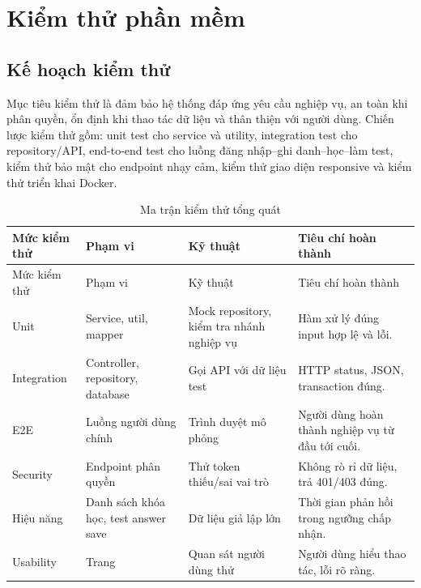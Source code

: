 \documentclass[12pt,a4paper]{report}
\begin{document}
\chapter{Kiểm thử phần mềm}

\section{Kế hoạch kiểm thử}
Mục tiêu kiểm thử là đảm bảo hệ thống đáp ứng yêu cầu nghiệp vụ, an toàn khi phân quyền, ổn định khi thao tác dữ liệu và thân thiện với người dùng. Chiến lược kiểm thử gồm: unit test cho service và utility, integration test cho repository/API, end-to-end test cho luồng đăng nhập--ghi danh--học--làm test, kiểm thử bảo mật cho endpoint nhạy cảm, kiểm thử giao diện responsive và kiểm thử triển khai Docker.

\begin{longtable}{L{2.2cm} L{3.2cm} L{4.2cm} L{4.8cm}}
\caption{Ma trận kiểm thử tổng quát}\label{tab:test-plan}\\
\toprule
Mức kiểm thử & Phạm vi & Kỹ thuật & Tiêu chí hoàn thành \\
\midrule
\endfirsthead\toprule Mức kiểm thử & Phạm vi & Kỹ thuật & Tiêu chí hoàn thành \\\midrule\endhead
Unit & Service, util, mapper & Mock repository, kiểm tra nhánh nghiệp vụ & Hàm xử lý đúng input hợp lệ và lỗi. \\
Integration & Controller, repository, database & Gọi API với dữ liệu test & HTTP status, JSON, transaction đúng. \\
E2E & Luồng người dùng chính & Trình duyệt mô phỏng & Người dùng hoàn thành nghiệp vụ từ đầu tới cuối. \\
Security & Endpoint phân quyền & Thử token thiếu/sai vai trò & Không rò rỉ dữ liệu, trả 401/403 đúng. \\
Hiệu năng & Danh sách khóa học, test answer save & Dữ liệu giả lập lớn & Thời gian phản hồi trong ngưỡng chấp nhận. \\
Usability & Trang  & Quan sát người dùng thử & Người dùng hiểu thao tác, lỗi rõ ràng. \\
\bottomrule
\end{longtable}
\end{document}
